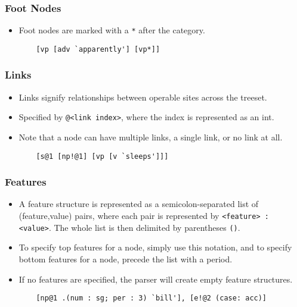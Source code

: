 \documentclass[10.5pt]{article}
\newcommand{\code}[1]{\texttt{#1}}
\begin{document}
\subsubsection{Foot Nodes}
  \begin{itemize}
	\item Foot nodes are marked with a \code{*} after the category.
	
	\begin{mdframed}[backgroundcolor=blue!5] 
	\begin{verbatim}
	[vp [adv `apparently'] [vp*]]
	\end{verbatim}
	\end{mdframed}
  \end{itemize}

\subsubsection{Links}
  \begin{itemize}
	\item Links signify relationships between operable sites across the treeset.
	\item Specified by \code{@<link index>}, where the index is represented as an int.
	\item Note that a node can have multiple links, a single link, or no link at all.
	
	\begin{mdframed}[backgroundcolor=blue!5] 
	\begin{verbatim}
	[s@1 [np!@1] [vp [v `sleeps']]]
	\end{verbatim}
	\end{mdframed}
  \end{itemize}

\subsubsection{Features}
  \begin{itemize}
	\item A feature structure is represented as a semicolon-separated list of
	  (feature,value) pairs, where each pair is represented by \code{<feature> : <value>}.
	  The whole list is then delimited by parentheses \code{()}. 
	\item To specify top features for a node, simply use this notation, and to specify bottom features for a node, precede the list with a period. 
	\item If no features are specified, the parser will create empty feature structures.
	
	\begin{mdframed}[backgroundcolor=blue!5] 
	\begin{verbatim}
	[np@1 .(num : sg; per : 3) `bill'], [e!@2 (case: acc)]
	\end{verbatim}
	\end{mdframed}
  \end{itemize}
\end{document}
